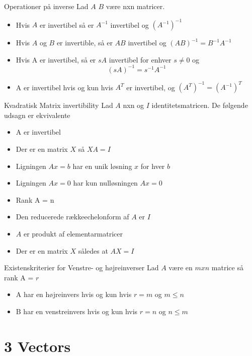 \documentclass[a4paper,fleqn]{article}
\begin{document}
	\begin{example}{Operationer på inverse}{}
		Lad $A$ $B$ være nxn matricer.
		\begin{itemize}
			\item Hvis $A$ er invertibel så er $A^{-1}$ invertibel og 
				$\left(A^{-1}\right)^{-1}$
			\item Hvis $A$ og $B$ er invertible, så er $AB$ invertibel og
				$(AB)^{-1} = B^{-1}A^{-1}$
			\item Hvis A er invertibel, så er $sA$ invertibel for enhver $s \neq 0$ og
				\[ (sA)^{-1} = s^{-1}A^{-1} \]
			\item A er invertibel hvis og kun hvis $A^T$ er invertibel, og $(A^T)^{-1}=
				(A^{-1})^T$
		\end{itemize}
	\end{example}
	\begin{theorem}{Kvadratisk Matrix invertibility}{}
		Lad $A$ nxn og $I$ identitetsmatricen. De følgende udsagn er ekvivalente
		\begin{itemize}
			\item A er invertibel
			\item Der er en matrix $X$ så $XA = I$
			\item Ligningen $Ax = b$ har en unik løsning $x$ for hver $b$
			\item Ligningen $Ax = 0$ har kun nulløsningen $Ax = 0$
			\item Rank A = n
			\item Den reducerede rækkeechelonform af $A$ er $I$
			\item $A$ er produkt af elementarmatricer
			\item Der er en matrix $X$ således at $AX = I$
		\end{itemize}
	\end{theorem}
	\begin{theorem}{Existenskriterier for Venstre- og højreinverser}{}
		Lad $A$ være en $m x n$ matrice så rank A = $r$
		\begin{itemize}
			\item A har en højreinvers hvis og kun hvis $r = m$ og $m \leq n$
			\item B har en venstreinvers hvis og kun hvis $r = n$ og $n \leq m$

		\end{itemize}
	\end{theorem}
	\section{3 Vectors}
\end{document}
